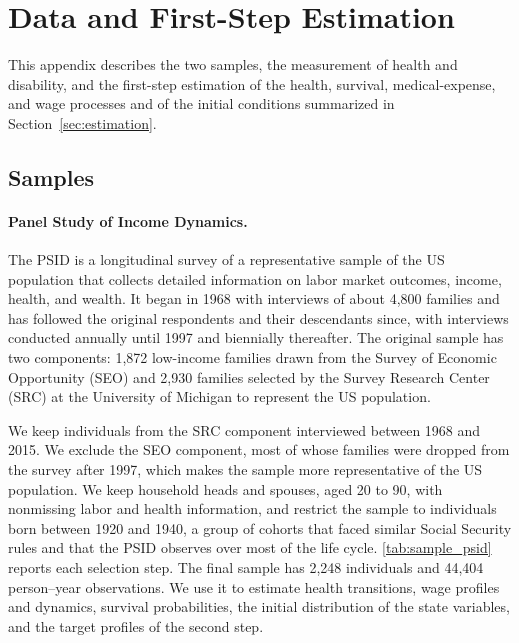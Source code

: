 \section{Data and First-Step Estimation}\label{app:data}

This appendix describes the two samples, the measurement of health and disability, and the first-step estimation of the health, survival, medical-expense, and wage processes and of the initial conditions summarized in Section~\ref{sec:estimation}.

\subsection{Samples}

\paragraph{Panel Study of Income Dynamics.} The PSID is a longitudinal survey of a representative sample of the US population that collects detailed information on labor market outcomes, income, health, and wealth. It began in 1968 with interviews of about 4,800 families %
and has followed the original respondents and their descendants since, with interviews conducted annually until 1997 and biennially thereafter. The original sample has two components: 1,872 low-income families drawn from the Survey of Economic Opportunity (SEO) and 2,930 families selected by the Survey Research Center (SRC) at the University of Michigan to represent the US population. %

We keep individuals from the SRC component interviewed between 1968 and 2015. We exclude the SEO component, most of whose families were dropped from the survey after 1997, which makes the sample more representative of the US population. We keep household heads and spouses, aged 20 to 90, with nonmissing labor and health information, and restrict the sample to individuals born between 1920 and 1940, a group of cohorts that faced similar Social Security rules and that the PSID observes over most of the life cycle. \autoref{tab:sample_psid} reports each selection step. The final sample has 2,248 individuals and 44,404 person--year observations. %
We use it to estimate health transitions, wage profiles and dynamics, survival probabilities, the initial distribution of the state variables, and the target profiles of the second step.


